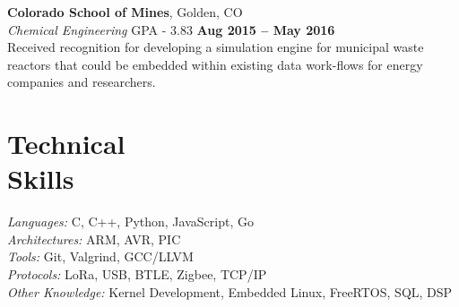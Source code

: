 \documentclass[margin,line]{resume}
\begin{document}
\begin{resume}
    \textbf{Colorado School of Mines}, Golden, CO \vspace{2mm}\\\vspace{1mm}%
    \textsl{Chemical Engineering} GPA - 3.83 \hfill \textbf{Aug 2015 -- May 2016}\\
    Received recognition for developing a simulation engine for municipal waste
    reactors that could be embedded within existing data work-flows for energy
    companies and researchers.

    \section{\mysidestyle Technical\\Skills}

    \emph{Languages:} C, C++, Python, JavaScript, Go\\
    \emph{Architectures:} ARM, AVR, PIC\\
    \emph{Tools:} Git, Valgrind, GCC/LLVM\\
    \emph{Protocols:} LoRa, USB, BTLE, Zigbee, TCP/IP\\
    \emph{Other Knowledge:} Kernel Development, Embedded Linux, FreeRTOS, SQL, DSP\\
\end{resume}
\end{document}
